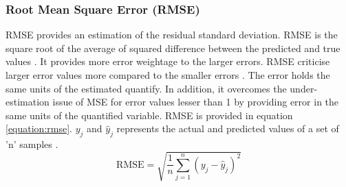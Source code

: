 \subsubsection{Root Mean Square Error (RMSE)}
\label{section:rmse_metric}
RMSE provides an estimation of the residual standard deviation. RMSE is the square root of the average of squared difference between the predicted and true values \cite{sklearn_api} \cite{scikit-learn}. It provides more error weightage to the larger errors. RMSE criticise larger error values more compared to the smaller errors \cite{sklearn_api} \cite{scikit-learn}. The error holds the same units of the estimated quantify. In addition, it overcomes the under-estimation issue of MSE for error values lesser than 1 by providing error in the same units of the quantified variable. RMSE is provided in equation \ref{equation:rmse}. $y_j$ and $\hat y_j$ represents the actual and predicted values of a set of 'n' samples \cite{sklearn_api} \cite{scikit-learn}. 
\begin{equation}
\mathrm{RMSE}=\sqrt{\frac{1}{n} \sum_{j=1}^{n}\left(y_{j}-\hat{y}_{j}\right)^2}
\label{equation:rmse}
\end{equation}






